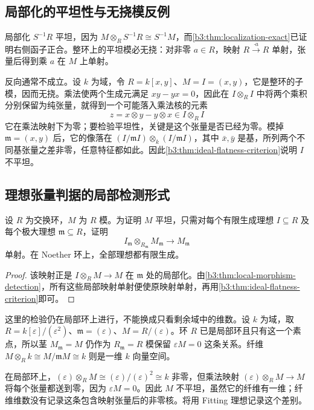 \subsection{局部化的平坦性与无挠模反例}\label{b3:subsec:1201:03}

局部化 \(S^{-1}R\) 平坦，因为 \(M\otimes_RS^{-1}R\cong S^{-1}M\)，而\cref{b3:thm:localization-exact}已证明右侧函子正合。整环上的平坦模必无挠：对非零 \(a\in R\)，映射 \(R\xrightarrow{\cdot a}R\) 单射，张量后得到乘 \(a\) 在 \(M\) 上单射。

\ProseParagraphBreak
反向通常不成立。设 \(k\) 为域，令 \(R=k[x,y]\)、\(M=I=(x,y)\)，它是整环的子模，因而无挠。乘法使两个生成元满足 \(xy-yx=0\)，因此在 \(I\otimes_RI\) 中将两个乘积分别保留为纯张量，就得到一个可能落入乘法核的元素
\[
	z=x\otimes y-y\otimes x\in I\otimes_R I
\]
它在乘法映射下为零；要检验平坦性，关键是这个张量是否已经为零。模掉 \(\mathfrak m=(x,y)\) 后，它的像落在 \((I/\mathfrak mI)\otimes_k(I/\mathfrak mI)\)，其中 \(\bar x,\bar y\) 是基，所列两个不同基张量之差非零，任意特征都如此。因此\cref{b3:thm:ideal-flatness-criterion}说明 \(I\) 不平坦。

\subsection{理想张量判据的局部检测形式}\label{b3:subsec:1201:04}

\begin{corollary}\label{b3:cor:local-ideal-flatness}
	设 \(R\) 为交换环，\(M\) 为 \(R\) 模。为证明 \(M\) 平坦，只需对每个有限生成理想 \(I\subseteq R\) 及每个极大理想 \(\mathfrak m\subseteq R\)，证明
	\[
		I_{\mathfrak m}\otimes_{R_{\mathfrak m}}M_{\mathfrak m} \longrightarrow M_{\mathfrak m}
	\]
	单射。在 Noether 环上，全部理想都有限生成。
\end{corollary}
\begin{proof}
	该映射正是 \(I\otimes_RM\to M\) 在 \(\mathfrak m\) 处的局部化。由\cref{b3:thm:local-morphism-detection}，所有这些局部映射单射便使原映射单射，再用\cref{b3:thm:ideal-flatness-criterion}即可。
\end{proof}

这里的检验仍在局部环上进行，不能换成只看剩余域中的维数。设 \(k\) 为域，取 \(R=k[\varepsilon]/(\varepsilon^2)\)、\(\mathfrak m=(\varepsilon)\)、\(M=R/(\varepsilon)\)。环 \(R\) 已是局部环且只有这一个素点，所以茎 \(M_{\mathfrak m}=M\) 仍作为 \(R_{\mathfrak m}=R\) 模保留 \(\varepsilon M=0\) 这条关系。纤维 \(M\otimes_R k\cong M/\mathfrak mM\cong k\) 则是一维 \(k\) 向量空间。

在局部环上，\((\varepsilon)\otimes_RM\cong(\varepsilon)/(\varepsilon)^2\cong k\) 非零，但乘法映射 \((\varepsilon)\otimes_RM\to M\) 将每个张量都送到零，因为 \(\varepsilon M=0\)。因此 \(M\) 不平坦，虽然它的纤维有一维；纤维维数没有记录这条包含映射张量后的非零核。将用 Fitting 理想记录这个差别。
